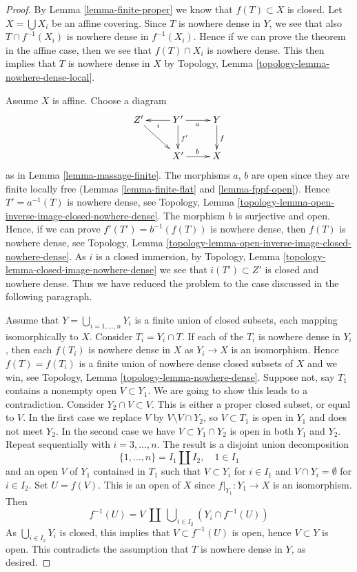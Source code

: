 \documentclass[10pt,a4paper]{amsart}
\theoremstyle{plain}
\theoremstyle{definition}
\theoremstyle{remark}
\numberwithin{equation}{subsection}
\begin{document}
\begin{proof}
By Lemma \ref{lemma-finite-proper} we know that $f(T) \subset X$ is closed.
Let $X = \bigcup X_i$ be an affine covering.
Since $T$ is nowhere dense in $Y$, we see that also $T \cap f^{-1}(X_i)$
is nowhere dense in $f^{-1}(X_i)$. Hence if we can prove the theorem in the
affine case, then we see that $f(T) \cap X_i$ is nowhere dense.
This then implies that $T$ is nowhere dense in $X$ by
Topology, Lemma \ref{topology-lemma-nowhere-dense-local}.

\medskip\noindent
Assume $X$ is affine. Choose a diagram
$$
\xymatrix{
Z' \ar[rd] &
Y' \ar[l]^i \ar[d]^{f'} \ar[r]_a &
Y \ar[d]^f \\
 & X' \ar[r]^b & X
}
$$
as in Lemma \ref{lemma-massage-finite}. The morphisms $a$, $b$ are
open since they are finite locally free
(Lemmas \ref{lemma-finite-flat} and \ref{lemma-fppf-open}).
Hence $T' = a^{-1}(T)$ is nowhere dense, see
Topology, Lemma \ref{topology-lemma-open-inverse-image-closed-nowhere-dense}.
The morphism $b$ is surjective and open.
Hence, if we can prove $f'(T') = b^{-1}(f(T))$ is
nowhere dense, then $f(T)$ is nowhere dense, see
Topology, Lemma \ref{topology-lemma-open-inverse-image-closed-nowhere-dense}.
As $i$ is a closed immersion, by
Topology, Lemma \ref{topology-lemma-closed-image-nowhere-dense}
we see that $i(T') \subset Z'$ is closed and nowhere dense.
Thus we have reduced the problem to the case discussed
in the following paragraph.

\medskip\noindent
Assume that $Y = \bigcup_{i = 1, \ldots, n} Y_i$ is a finite union of
closed subsets, each mapping isomorphically to $X$. Consider
$T_i = Y_i \cap T$. If each of the $T_i$ is nowhere dense in $Y_i$,
then each $f(T_i)$ is nowhere dense in $X$ as $Y_i \to X$ is an isomorphism.
Hence $f(T) = f(T_i)$ is a finite union of nowhere dense closed
subsets of $X$ and we win, see
Topology, Lemma \ref{topology-lemma-nowhere-dense}.
Suppose not, say $T_1$ contains a nonempty open $V \subset Y_1$.
We are going to show this leads to a contradiction.
Consider $Y_2 \cap V \subset V$. This is either
a proper closed subset, or equal to $V$. In the first case we replace
$V$ by $V \setminus V \cap Y_2$, so $V \subset T_1$ is open in $Y_1$ and
does not meet $Y_2$. In the second case we have
$V \subset Y_1 \cap Y_2$ is open in both $Y_1$ and $Y_2$.
Repeat sequentially with $i = 3, \ldots, n$. The result is a disjoint
union decomposition
$$
\{1, \ldots, n\} = I_1 \amalg I_2, \quad 1 \in I_1
$$
and an open $V$ of $Y_1$ contained in $T_1$ such that $V \subset Y_i$
for $i \in I_1$ and $V \cap Y_i = \emptyset$ for $i \in I_2$. Set
$U = f(V)$. This is an open of $X$ since $f|_{Y_1} : Y_1 \to X$ is
an isomorphism. Then
$$
f^{-1}(U) = V\ \amalg\ \bigcup\nolimits_{i \in I_2} (Y_i \cap f^{-1}(U))
$$
As $\bigcup_{i \in I_2} Y_i$ is closed, this implies that
$V \subset f^{-1}(U)$ is open, hence $V \subset Y$ is open.
This contradicts the assumption that $T$ is nowhere dense in $Y$, as desired.
\end{proof}
\end{document}
